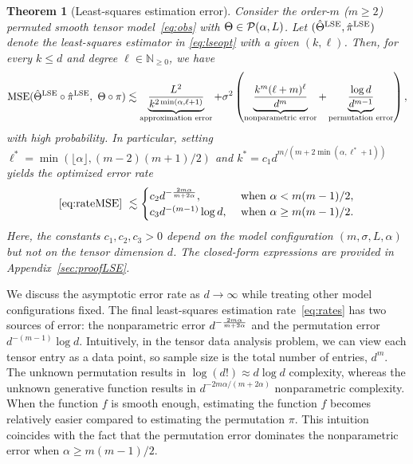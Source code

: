 \documentclass[12pt]{article}
\newtheorem{thm}{Theorem}
\theoremstyle{definition}
\newcommand*{\KeepStyleUnderBrace}[1]{%
  \mathop{%
    \mathchoice
    {\underbrace{\displaystyle#1}}%
    {\underbrace{\textstyle#1}}%
    {\underbrace{\scriptstyle#1}}%
    {\underbrace{\scriptscriptstyle#1}}%
  }\limits
}
\begin{document}
\begin{thm}[Least-squares estimation error]\label{thm:LSE} Consider the order-$m$ ($m\geq 2$) permuted smooth tensor model~\eqref{eq:obs} with $\Theta\in\mathcal{P}(\alpha,L)$.
Let $(\hat\Theta^{\textup{LSE}},\hat\pi^{\textup{LSE}})$ denote the least-squares estimator in \eqref{eq:lseopt} with a given $(k,\ell)$. Then, for every $k\leq d$ and degree $\ell\in \mathbb{N}_{\geq 0}$, we have
\begin{align}\label{eq:rateMSE}
\textup{MSE}(\hat\Theta^{\textup{LSE}}\circ\hat\pi^{\textup{LSE}},\ \Theta\circ\pi)\lesssim \KeepStyleUnderBrace{\frac{L^2}{k^{2\min(\alpha,\ell+1)}}}_{\textup{approximation error}}+ \sigma^2\left(\KeepStyleUnderBrace{\frac{k^m(\ell+m)^\ell}{d^m}}_{\textup{nonparametric error}}+\KeepStyleUnderBrace{\frac{\log d}{d^{m-1}}}_{\textup{permutation error}}\right),
\end{align}
with high probability. In particular, setting {\small $\ell^* = \min(\lfloor \alpha\rfloor,(m-2)(m+1)/2)$} and $k^*=c_1 d^{m/(m+2\min(\alpha,\ell^*+1))}$
yields the optimized error rate
\begin{align}\label{eq:rates}
     \eqref{eq:rateMSE}\ \lesssim 
     \begin{cases} 
    c_2 d^{-\frac{2m\alpha}{m+2\alpha}}, & \text{ when } \alpha < m(m-1)/2,\\
     c_3 d^{-(m-1)}\log d, &\text{ when } \alpha \geq m(m-1)/2.
    \end{cases}
\end{align}
Here, the constants $c_1,c_2,c_3>0$ depend on the model configuration $(m,\sigma, L,\alpha)$ but not on the tensor dimension $d$. The closed-form expressions are provided in Appendix~\ref{sec:proofLSE}.
\end{thm}

We discuss the asymptotic error rate as $d\rightarrow \infty$ while treating other model configurations fixed. The final least-squares estimation rate~\eqref{eq:rates} has two sources of error: the nonparametric error $d^{-{2m\alpha\over m+2\alpha}}$ and the permutation error $d^{-(m-1)}\log d$. Intuitively, in the tensor data analysis problem, we can view each tensor entry as a data point, so sample size is the total number of entries, $d^m$. The unknown permutation results in $\log(d!)\approx d\log d$ complexity, whereas the unknown generative function results in $d^{-2m\alpha/(m+2\alpha)}$ nonparametric complexity. When the function $f$ is smooth enough, estimating the function $f$ becomes relatively easier compared to estimating the permutation $\pi$. This intuition coincides with the fact that the permutation error dominates the nonparametric error when  $\alpha\geq m(m-1)/2$. 
\end{document}

